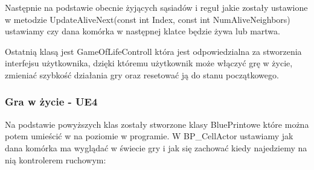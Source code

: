 \documentclass[a4paper,12pt,reqno]{article}
\begin{document}


Następnie na podstawie obecnie żyjących sąsiadów i reguł jakie zostały ustawione w metodzie UpdateAliveNext(const int Index, const int NumAliveNeighbors) ustawiamy czy dana komórka w następnej klatce będzie żywa lub martwa.



Ostatnią klasą jest GameOfLifeControll która jest odpowiedzialna
za stworzenia interfejsu użytkownika, dzięki któremu użytkownik może włączyć grę w życie, zmieniać szybkość działania gry oraz resetować ją do stanu początkowego.
\subsubsection{Gra w życie - UE4}

Na podstawie powyższych klas zostały stworzone klasy BluePrintowe które można potem umieścić w na poziomie w programie. W BP\_CellActor ustawiamy jak dana komórka ma wyglądać w świecie gry i jak się zachować kiedy najedziemy na nią kontrolerem ruchowym:
\end{document}
